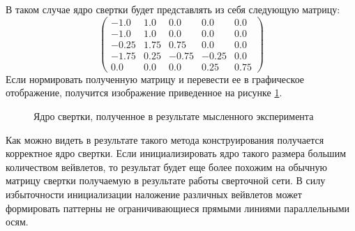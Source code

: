 \documentclass[utf8,usehyperref,14pt]{G7-32}
\begin{document}
В таком случае ядро свертки будет представлять из себя следующую матрицу:
\[ \left( \begin{array}{ccccc}
-1.0 & 1.0 & 0.0 & 0.0 & 0.0 \\
-1.0 & 1.0 & 0.0 & 0.0 & 0.0 \\
-0.25 & 1.75 & 0.75 & 0.0 & 0.0 \\
-1.75 & 0.25 & -0.75 & -0.25 & 0.0 \\
0.0 & 0.0 & 0.0 & 0.25 & 0.75 \end{array} \right)\]
Если нормировать полученную матрицу и перевести ее в графическое отображение, получится изображение приведенное на рисунке \ref{convolution_matrix}.
\begin{figure}[H]
  \caption{Ядро свертки, полученное в результате мысленного эксперимента}\label{convolution_matrix}
\end{figure}

Как можно видеть в результате такого метода конструирования получается корректное ядро свертки. Если инициализировать ядро такого размера большим количеством вейвлетов, то результат будет еще более похожим на обычную матрицу свертки получаемую в результате работы сверточной сети. В силу избыточности инициализации наложение различных вейвлетов может формировать паттерны не ограничивающиеся прямыми линиями параллельными осям.
\end{document}
